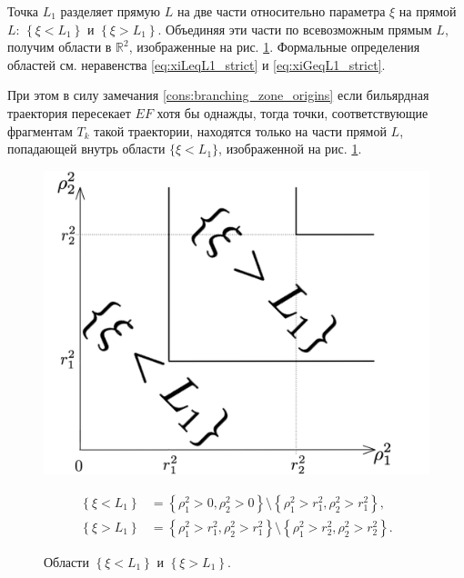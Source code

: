 \medskip

Точка $L_1$ разделяет прямую $L$ на две части относительно параметра $\xi$ на прямой $L$: $\left\{\xi < L_1\right\}$ и $\left\{\xi > L_1\right\}$. 
Объединяя эти части по всевозможным прямым $L$, получим области в $\mathbb{R}^2$, изображенные на  рис. \ref{fig:pt10:_lineDomains_simple}. Формальные определения областей см. неравенства \eqref{eq:xiLeqL1_strict} и \eqref{eq:xiGeqL1_strict}.

При этом в силу замечания \ref{cons:branching_zone_origins} если бильярдная траектория пересекает $EF$ хотя бы однажды, тогда точки, соответствующие фрагментам $T_k$ такой траектории, находятся только на части прямой $L$, попадающей внутрь области $\{ \xi < L_1\}$, изображенной на рис. \ref{fig:pt10:_lineDomains_simple}.

\begin{figure}[!htb]
    \begin{minipage}[c]{0.4\textwidth}
\centering
\includegraphics[scale=0.07]{images/ch4/section3_circular/line_domains_simple.pdf}
    \caption{Области $\left\{\xi< L_1\right\}$ и $\left\{\xi > L_1\right\}$.}
    \label{fig:pt10:_lineDomains_simple}
     \end{minipage}
     \begin{minipage}{0.6\textwidth}
\begin{align}
\left\{\xi < L_1 \right\} &=  \left\{\rho_1^2 > 0 , \rho_2^2 > 0 \right\} \setminus \left\{\rho_1^2 > r_1^2 , \rho_2^2 > r_1^2  \right\}, 
\label{eq:xiLeqL1_strict}
\\[15pt]
\left\{\xi > L_1\right\} &= \left\{\rho_1^2 > r_1^2 , \rho_2^2 > r_1^2\right\} \setminus \left\{\rho_1^2 > r_2^2 , \rho_2^2 > r_2^2  \right\}.
\label{eq:xiGeqL1_strict}
\end{align}

    \end{minipage}
\end{figure}

